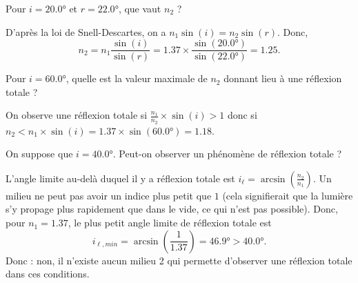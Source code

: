 	
	\debutEntrainement
	
	
	
	
	
	\begin{enonce}
		Pour $i=\ang{20.0}$ et $r=\ang{22.0}$, que vaut $n_2$ ?
	\end{enonce}
	
	
	\begin{corrige}
		D'après la loi de Snell-Descartes, on a $n_1\sin(i)=n_2\sin(r)$. Donc, 
		\[
		n_2=n_1\frac{\sin(i)}{\sin(r)}=\num{1.37}\times \frac{\sin(\ang{20.0})}{\sin(\ang{22.0})}=\num{1.25}.
		\]
	\end{corrige}
	
	
	\begin{enonce}
		Pour $i=\ang{60,0}$,
		quelle est la valeur maximale de $n_2$ donnant lieu à une réflexion totale ?
	\end{enonce}
	
	
	\begin{corrige}
		On observe une réflexion totale si $\frac{n_1}{n_2}\times \sin(i)>1$ donc si $n_2<n_1\times \sin(i)=\num{1.37}\times\sin(\ang{60,0})=\num{1.18}$.
	\end{corrige}
	
	
	\begin{enonce}
		On suppose que $i=\ang{40.0}$. Peut-on observer un phénomène de réflexion totale ?
	\end{enonce}
	
	
	\begin{corrige}
		L'angle limite au-delà duquel il y a réflexion totale est $i_\ell=\arcsin\left(\frac{n_2}{n_1}\right)$. Un milieu ne peut pas avoir un indice plus petit que $1$ (cela signifierait que la lumière s'y propage plus rapidement que dans le vide, ce qui n'est pas possible). Donc, pour $n_1=\num{1.37}$, le plus petit angle limite de réflexion totale est 
		\[
		i_{\ell,min}=\arcsin\left(\frac{\num{1}}{\num{1.37}}\right)=\ang{46.9}>\ang{40.0}.
		\]
	Donc :  non, il n'existe aucun milieu 2 qui permette d'observer une réflexion totale dans ces conditions.
	\end{corrige}
	

